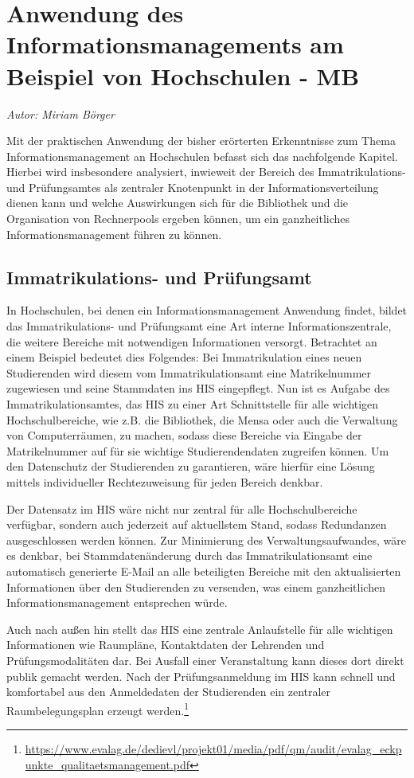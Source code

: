 \section{Anwendung des Informationsmanagements am Beispiel von Hochschulen - MB}
\textit{Autor: Miriam Börger}

Mit der praktischen Anwendung der bisher erörterten Erkenntnisse zum Thema Informationsmanagement an Hochschulen befasst sich das nachfolgende Kapitel. Hierbei wird insbesondere analysiert, inwieweit der Bereich des Immatrikulations- und Prüfungsamtes als zentraler Knotenpunkt in der Informationsverteilung dienen kann und welche Auswirkungen sich für die Bibliothek und die Organisation von Rechnerpools ergeben können, um ein ganzheitliches Informationsmanagement führen zu können.

\subsection{Immatrikulations- und Prüfungsamt}
\label{immatrikulations_und_pruefungsamt}
In Hochschulen, bei denen ein Informationsmanagement Anwendung findet, bildet das Immatrikulations- und Prüfungsamt eine Art interne Informationszentrale, die weitere Bereiche mit notwendigen Informationen versorgt. Betrachtet an einem Beispiel bedeutet dies Folgendes: Bei Immatrikulation eines neuen Studierenden wird diesem vom Immatrikulationsamt eine Matrikelnummer zugewiesen und seine Stammdaten ins HIS eingepflegt. Nun ist es Aufgabe des Immatrikulationsamtes, das HIS zu einer Art Schnittstelle für alle wichtigen Hochschulbereiche, wie z.B. die Bibliothek, die Mensa oder auch die Verwaltung von Computerräumen, zu machen, sodass diese Bereiche via Eingabe der Matrikelnummer auf für sie wichtige Studierendendaten zugreifen können. Um den Datenschutz der Studierenden zu garantieren, wäre hierfür eine Lösung mittels individueller Rechtezuweisung für jeden Bereich denkbar. 

Der Datensatz im HIS wäre nicht nur zentral für alle Hochschulbereiche verfügbar, sondern auch jederzeit auf aktuellstem Stand, sodass Redundanzen ausgeschlossen werden können. Zur Minimierung des Verwaltungsaufwandes, wäre es denkbar, bei Stammdatenänderung durch das Immatrikulationsamt eine automatisch generierte E-Mail an alle beteiligten Bereiche mit den aktualisierten Informationen über den Studierenden zu versenden, was einem ganzheitlichen Informationsmanagement entsprechen würde.

Auch nach außen hin stellt das HIS eine zentrale Anlaufstelle für alle wichtigen Informationen wie Raumpläne, Kontaktdaten der Lehrenden und Prüfungsmodalitäten dar. Bei Ausfall einer Veranstaltung kann dieses dort direkt publik gemacht werden. Nach der Prüfungsanmeldung im HIS kann schnell und komfortabel aus den Anmeldedaten der Studierenden ein zentraler Raumbelegungsplan erzeugt werden.\footnote{\url{https://www.evalag.de/dedievl/projekt01/media/pdf/qm/audit/evalag_eckpunkte_qualitaetsmanagement.pdf}}

